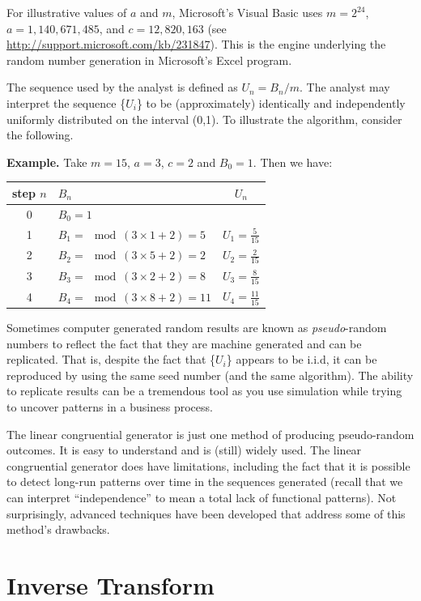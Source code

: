 \documentclass[]{book}
\theoremstyle{definition}
\theoremstyle{definition}
\theoremstyle{definition}
\theoremstyle{remark}
\begin{document}
For illustrative values of \(a\) and \(m\), Microsoft's Visual Basic
uses \(m=2^{24}\), \(a=1,140,671,485\), and \(c = 12,820,163\) (see
\url{http://support.microsoft.com/kb/231847}). This is the engine
underlying the random number generation in Microsoft's Excel program.

The sequence used by the analyst is defined as \(U_n=B_n/m.\) The
analyst may interpret the sequence \{\(U_{i}\)\} to be (approximately)
identically and independently uniformly distributed on the interval
(0,1). To illustrate the algorithm, consider the following.

\textbf{Example.} Take \(m=15\), \(a=3\), \(c=2\) and \(B_0=1\). Then we
have:

\begin{longtable}[]{@{}clc@{}}
\toprule
step \(n\) & \(B_n\) & \(U_n\)\tabularnewline
\midrule
\endhead
0 & \(B_0=1\) &\tabularnewline
1 & \(B_1 =\mod(3 \times 1 +2) = 5\) &
\(U_1 = \frac{5}{15}\)\tabularnewline
2 & \(B_2 =\mod(3 \times 5 +2) = 2\) &
\(U_2 = \frac{2}{15}\)\tabularnewline
3 & \(B_3 =\mod(3 \times 2 +2) = 8\) &
\(U_3 = \frac{8}{15}\)\tabularnewline
4 & \(B_4 =\mod(3 \times 8 +2) = 11\) &
\(U_4 = \frac{11}{15}\)\tabularnewline
\bottomrule
\end{longtable}

Sometimes computer generated random results are known as
\emph{pseudo}-random numbers to reflect the fact that they are machine
generated and can be replicated. That is, despite the fact that
\{\(U_{i}\)\} appears to be i.i.d, it can be reproduced by using the
same seed number (and the same algorithm). The ability to replicate
results can be a tremendous tool as you use simulation while trying to
uncover patterns in a business process.

The linear congruential generator is just one method of producing
pseudo-random outcomes. It is easy to understand and is (still) widely
used. The linear congruential generator does have limitations, including
the fact that it is possible to detect long-run patterns over time in
the sequences generated (recall that we can interpret ``independence''
to mean a total lack of functional patterns). Not surprisingly, advanced
techniques have been developed that address some of this method's
drawbacks.

\section{Inverse Transform}\label{inverse-transform}
\end{document}
